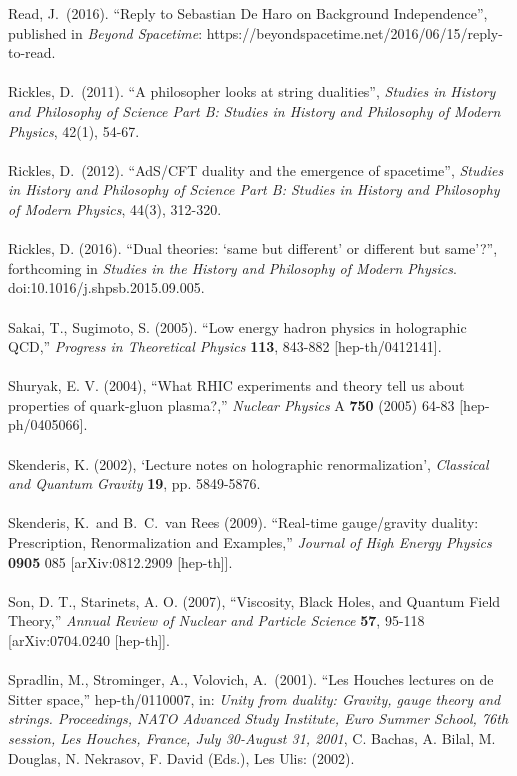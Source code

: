 \documentclass[12pt]{article}
\renewcommand{\^}[1]{\hat{#1}}
\begin{document}
Read, J.~(2016). ``Reply to Sebastian De Haro on Background Independence'', published in {\it Beyond Spacetime}: https://beyondspacetime.net/2016/06/15/reply-to-read.\\
\\
Rickles, D.~(2011). ``A philosopher looks at string dualities'',  \emph{Studies in History and Philosophy of Science Part B: Studies in History and Philosophy of Modern Physics}, 42(1), 54-67.\\
\\
Rickles, D.~(2012). ``AdS/CFT duality and the emergence of spacetime'', \emph{Studies in History and Philosophy of Science Part B: Studies in History and Philosophy of Modern Physics}, 44(3), 312-320.\\
\\
Rickles, D. (2016). ``Dual theories: `same but different' or different but same'?'', forthcoming in {\em Studies in the History and Philosophy of Modern Physics}. doi:10.1016/j.shpsb.2015.09.005.\\
\\
Sakai, T., Sugimoto, S. (2005). ``Low energy hadron physics in holographic QCD,''
{\it Progress in Theoretical Physics}  {\bf 113}, 843-882
  [hep-th/0412141].\\
  \\
Shuryak, E. V. (2004), ``What RHIC experiments and theory tell us about properties of quark-gluon plasma?,''
 {\it Nuclear Physics} A {\bf 750}  (2005) 64-83
  [hep-ph/0405066].\\
\\
Skenderis, K. (2002), `Lecture notes on holographic renormalization', {\em Classical and Quantum Gravity} {\bf 19}, pp. 5849-5876.\\
\\
Skenderis, K.~and B.~C.~van Rees (2009).   ``Real-time gauge/gravity duality: Prescription, Renormalization and Examples,''
  {\it Journal of High Energy Physics} {\bf 0905}  085
  [arXiv:0812.2909 [hep-th]].\\
\\
Son, D. T., Starinets, A. O. (2007), ``Viscosity, Black Holes, and Quantum Field Theory,'' {\it Annual Review of Nuclear and Particle Science} {\bf 57}, 95-118 
  [arXiv:0704.0240 [hep-th]].\\
\\
Spradlin, M., Strominger, A., Volovich, A.~(2001). ``Les Houches lectures on de Sitter space,''
  hep-th/0110007, in: {\it Unity from duality: Gravity, gauge theory and strings. Proceedings, NATO Advanced Study Institute, Euro Summer School, 76th session, Les Houches, France, July 30-August 31, 2001}, C. Bachas, A. Bilal, M. Douglas, N. Nekrasov, F. David (Eds.), Les Ulis: (2002). \\
\end{document}
